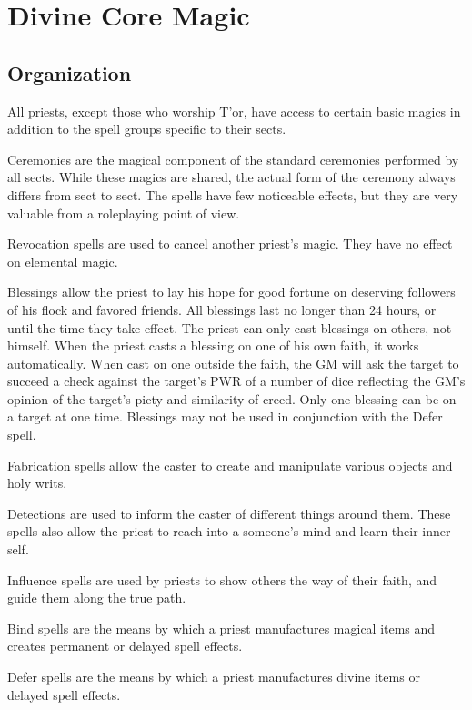 \chapter{Divine Core Magic}
\label{ch:divine-core-magic}
\section{Organization}
All priests, except those who worship T’or, have access to certain basic magics in addition to the spell groups specific to their sects.

Ceremonies are the magical component of the standard ceremonies performed by all sects. While these magics are shared, the actual form of the ceremony always differs from sect to sect. The spells have few noticeable effects, but they are very valuable from a roleplaying point of view.

Revocation spells are used to cancel another priest’s magic. They have no effect on elemental magic.

Blessings allow the priest to lay his hope for good fortune on deserving followers of his flock and favored friends. All blessings last no longer than 24 hours, or until the time they take effect. The priest can only cast blessings on others, not himself. When the priest casts a blessing on one of his own faith, it works automatically. When cast on one outside the faith, the GM will ask the target to succeed a check against the target’s PWR of a number of dice reflecting the GM’s opinion of the target’s piety and similarity of creed. Only one blessing can be on a target at one time. Blessings may not be used in conjunction with the Defer spell.

Fabrication spells allow the caster to create and manipulate various objects and holy writs.

Detections are used to inform the caster of different things around them. These spells also allow the priest to reach into a someone's mind and learn their inner self.

Influence spells are used by priests to show others the way of their faith, and guide them along the true path.

Bind spells are the means by which a priest manufactures magical items and creates permanent or delayed spell effects.

Defer spells are the means by which a priest manufactures divine items or delayed spell effects.

